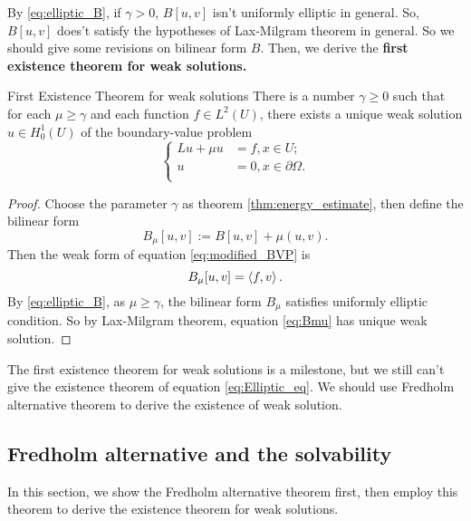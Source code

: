 By \eqref{eq:elliptic_B}, if $\gamma>0$, $B[u,v]$ isn't uniformly elliptic in general. So, $B[u,v]$ does't satisfy the hypotheses of Lax-Milgram theorem in general. So we should give some revisions on bilinear form $B$. Then, we derive the \textbf{first existence theorem for weak solutions.}
\begin{theorem}{First Existence Theorem for weak solutions}
    \label{thm:1st_exist}
    There is a number $\gamma\ge 0$ such that for each $\mu\ge\gamma$ and each function $f\in L^{2}(U)$, there exists a unique weak solution $u\in H_{0}^{1}(U)$ of the boundary-value problem 
    \begin{equation}
        \label{eq:modified_BVP}
        \left\{
            \begin{aligned}
                Lu+\mu u&=f,x\in U;\\
                u&=0,x\in\partial\Omega.\\
            \end{aligned}
        \right.
    \end{equation}
\end{theorem}
\begin{proof}
    Choose the parameter $\gamma$ as theorem \ref{thm:energy_estimate}, then define the bilinear form 
    \begin{equation}
        \label{eq:Bmu}
        B_{\mu}[u,v]:=B[u,v]+\mu(u,v).
    \end{equation}
    Then the weak form of equation \eqref{eq:modified_BVP} is 
    \begin{equation}
        B_{\mu}[u,v]=\left<f,v\right>.
    \end{equation}
    By \eqref{eq:elliptic_B}, as $\mu\ge\gamma$, the bilinear form $B_{\mu}$ satisfies uniformly elliptic condition. So by Lax-Milgram theorem, equation \eqref{eq:Bmu} has unique weak solution.
\end{proof}
\begin{remark}
    The first existence theorem for weak solutions is a milestone, but we still can't give the existence theorem of equation \eqref{eq:Elliptic_eq}. We should use Fredholm alternative theorem to derive the existence of weak solution.
\end{remark}
\subsection{Fredholm alternative and the solvability}
In this section, we show the Fredholm alternative theorem first, then employ this theorem to derive the existence theorem for weak solutions.

